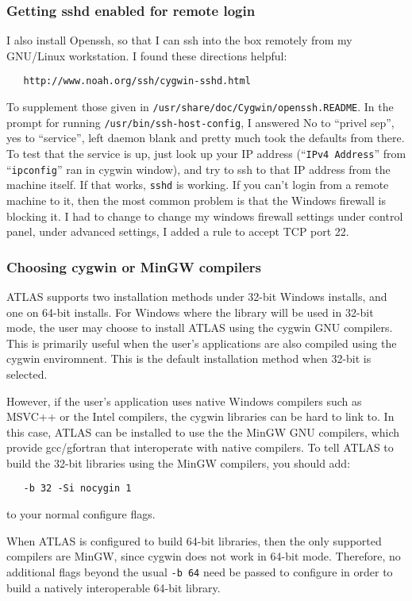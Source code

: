 \documentclass[11pt]{article}
\begin{document}
{\subsubsection{Getting sshd enabled for remote login}
I also install Openssh, so that I can ssh into the box remotely from my
GNU/Linux workstation.  I found these directions helpful:
\begin{verbatim}
   http://www.noah.org/ssh/cygwin-sshd.html
\end{verbatim}
To supplement those given in \texttt{/usr/share/doc/Cygwin/openssh.README}.
In the prompt for running {\tt /usr/bin/ssh-host-config}, I answered
No to ``privel sep'', yes to ``service'', left daemon blank and pretty
much took the defaults from there.  To test that the service is up,
just look up your IP address (``\texttt{IPv4 Address}'' from 
``\texttt{ipconfig}'' ran in cygwin window), and try to ssh to that IP
address from the machine itself.  If that works, {\tt sshd} is working.
If you can't login from a remote machine to it, then the most common
problem is that the Windows firewall is blocking it.  I had to change
to change my windows firewall settings under control panel, under advanced
settings, I added a rule to accept TCP port 22.
}

\subsubsection{Choosing cygwin or MinGW compilers}
ATLAS supports two installation methods under 32-bit Windows installs, and one
on 64-bit installs.  For Windows where the library will be used in 32-bit
mode, the user may choose to install ATLAS using the cygwin GNU compilers.
This is primarily useful when the user's applications are also compiled 
using the cygwin enviromnent.  This is the default installation method
when 32-bit is selected.

However, if the user's application uses native Windows compilers such as
MSVC++ or the Intel compilers, the cygwin libraries can be hard to link to.
In this case, ATLAS can be installed to use the the MinGW GNU compilers, which
provide gcc/gfortran that interoperate with native compilers.  To tell
ATLAS to build the 32-bit libraries using the MinGW compilers, you should add:
\begin{verbatim}
   -b 32 -Si nocygin 1
\end{verbatim}
to your normal configure flags.

When ATLAS is configured to build 64-bit libraries, then the only supported
compilers are MinGW, since cygwin does not work in 64-bit mode.  Therefore,
no additional flags beyond the usual \verb+-b 64+ need be passed to configure
in order to build a natively interoperable 64-bit library.
\end{document}
